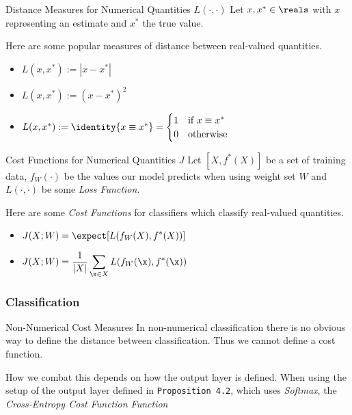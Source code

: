 \documentclass[11pt,a4paper]{article}
\begin{document}
  \begin{proposition}{Distance Measures for Numerical Quantities $L(\cdot,\cdot)$}
    Let $x,x^*\in\reals$ with $x$ representing an estimate and $x^*$ the true value.
    \par Here are some popular measures of distance between real-valued quantities.
    \begin{itemize}
      \item[\textit{Identity Distance}] $L(x,x^*):=|x-x^*|$
      \item[\textit{Absolute Distance}] $L(x,x^*):=(x-x^*)^2$
      \item[\textit{Quadratic Distance}] $L(x,x^*):=\identity\{x\equiv x^*\}=\begin{cases}1&\text{if }x\equiv x^*\\0&\text{otherwise} \end{cases}$
    \end{itemize}
  \end{proposition}

  \begin{proposition}{Cost Functions for Numerical Quantities $J$}
    Let $[X,f^*(X)]$ be a set of training data, $f_W(\cdot)$ be the values our model predicts when using weight set $W$ and $L(\cdot,\cdot)$ be some \textit{Loss Function}.
    \par Here are some \textit{Cost Functions} for classifiers which classify real-valued quantities.
    \begin{itemize}
      \item[\textit{Expected Loss}] $\displaystyle J(X;W)=\expect[L(f_W(X),f^*(X))]$
      \item[\textit{Empirical Risk}] $\displaystyle J(X;W)=\frac1{|X|}\sum_{\x\in X}L(f_W(\x),f^*(\x))$
    \end{itemize}
  \end{proposition}

\subsubsection{Classification}

  \begin{remark}{Non-Numerical Cost Measures}
    In non-numerical classification there is no obvious way to define the distance between classification. Thus we cannot define a cost function.
    \par How we combat this depends on how the output layer is defined. When using the setup of the output layer defined in \texttt{Proposition 4.2}, which uses \textit{Softmax}, the \textit{Cross-Entropy Cost Function Function}
  \end{remark}
\end{document}
